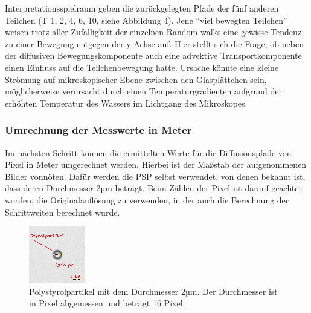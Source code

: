 \documentclass[
  9pt,
]{article}
\begin{document}
Interpretationsspielraum geben die zurückgelegten Pfade der fünf anderen
Teilchen (T 1, 2, 4, 6, 10, siehe Abbildung 4). Jene ``viel bewegten
Teilchen'' weisen trotz aller Zufälligkeit der einzelnen Random-walks
eine gewisse Tendenz zu einer Bewegung entgegen der y-Achse auf. Hier
stellt sich die Frage, ob neben der diffusiven Bewegungskomponente auch
eine advektive Transportkomponente einen Einfluss auf die
Teilchenbewegung hatte. Ursache könnte eine kleine Strömung auf
mikroskopischer Ebene zwischen den Glasplättchen sein, möglicherweise
verursacht durch einen Temperaturgradienten aufgrund der erhöhten
Temperatur des Wassers im Lichtgang des Mikroskopes.

\hypertarget{umrechnung-der-messwerte-in-meter}{%
\subsubsection{Umrechnung der Messwerte in
Meter}\label{umrechnung-der-messwerte-in-meter}}

Im nächsten Schritt können die ermittelten Werte für die Diffusionspfade
von Pixel in Meter umgerechnet werden. Hierbei ist der Maßstab der
aufgenommenen Bilder vonnöten. Dafür werden die PSP selbst verwendet,
von denen bekannt ist, dass deren Durchmesser 2µm beträgt. Beim Zählen
der Pixel ist darauf geachtet worden, die Originalauflösung zu
verwenden, in der auch die Berechnung der Schrittweiten berechnet wurde.

\begin{figure}
\centering
\includegraphics[width=\textwidth,height=0.21\textheight]{Bilder/styrolpartikel.png}
\caption{Polystyrolpartikel mit dem Durchmesser 2µm. Der Durchmesser ist
in Pixel abgemessen und beträgt 16 Pixel.}
\end{figure}
\end{document}
